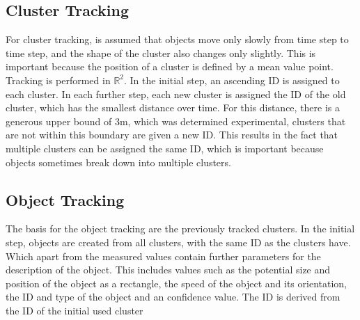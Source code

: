 \documentclass[11pt,oneside,openright]{mpreport}
\begin{document}
\subsection{Cluster Tracking}
For cluster tracking, is assumed that objects move only slowly from time step to time step, and the shape of the cluster also changes only slightly. 
This is important because the position of a cluster is defined by a mean value point. Tracking is performed in $\mathbb{R}^2$. 
In the initial step, an ascending ID is assigned to each cluster.
In each further step, each new cluster is assigned the ID of the old cluster, which has the smallest distance over time.
For this distance, there is a generous upper bound of 3m, which was determined experimental, clusters that are not within this boundary are given a new ID.
This results in the fact that multiple clusters can be assigned the same ID, which is important because objects sometimes break down into multiple clusters.

\subsection{Object Tracking}
The basis for the object tracking are the previously tracked clusters. In the initial step, objects are created from all clusters, with the same ID as the clusters have.
Which apart from the measured values contain further parameters for the description of the object. This includes values such as the potential size and 
position of the object as a rectangle, the speed of the object and its orientation, the ID and type of the object and an confidence value. 
The ID is derived from the ID of the initial used cluster
\end{document}
